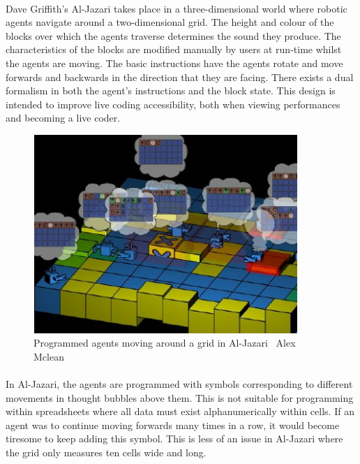 \paragraph{} Dave Griffith's Al-Jazari \cite{mclean:visualisation} takes place in a three-dimensional world where robotic agents navigate around a two-dimensional grid. The height and colour of the blocks over which the agents traverse determines the sound they produce. The characteristics of the blocks are modified manually by users at run-time whilst the agents are moving. The basic instructions have the agents rotate and move forwards and backwards in the direction that they are facing. There exists a dual formalism in both the agent's instructions and the block state. This design is intended to improve live coding accessibility, both when viewing performances and becoming a live coder.

\begin{figure}[ht]
  \centerline{\includegraphics[width=100mm]{figs/alJazari.jpg}}
\caption{Programmed agents moving around a grid in Al-Jazari \textcopyright\ Alex Mclean}
\label{prep:alJazari}
\end{figure}

\vspace{-20pt}
\paragraph{} In Al-Jazari, the agents are programmed with symbols corresponding to different movements in thought bubbles above them. This is not suitable for programming within spreadsheets where all data must exist alphanumerically within cells. If an agent was to continue moving forwards many times in a row, it would become tiresome to keep adding this symbol. This is less of an issue in Al-Jazari where the grid only measures ten cells wide and long.

